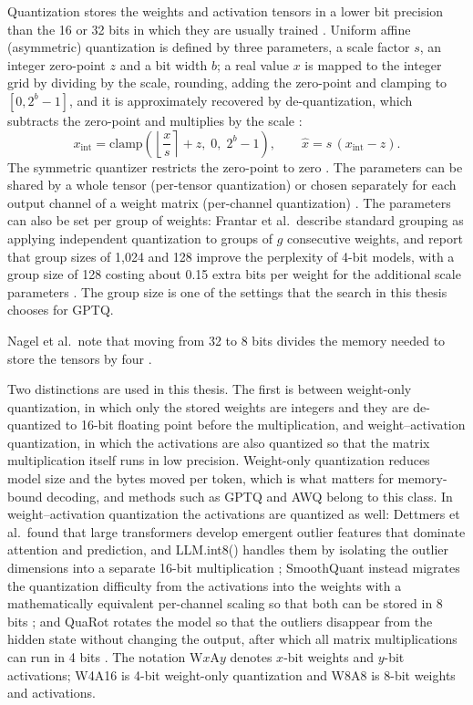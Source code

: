 Quantization stores the weights and activation tensors in a lower bit precision than the 16 or 32 bits in which they are usually trained \cite{nagel2021whitepaper}. Uniform affine (asymmetric) quantization is defined by three parameters, a scale factor $s$, an integer zero-point $z$ and a bit width $b$; a real value $x$ is mapped to the integer grid by dividing by the scale, rounding, adding the zero-point and clamping to $[0, 2^b - 1]$, and it is approximately recovered by de-quantization, which subtracts the zero-point and multiplies by the scale \cite{nagel2021whitepaper}:
\begin{equation}
  x_{\mathrm{int}} = \mathrm{clamp}\left( \left\lfloor \frac{x}{s} \right\rceil + z,\; 0,\; 2^b - 1 \right), \qquad
  \hat{x} = s \,(x_{\mathrm{int}} - z).
  \label{eq:ch2-quant}
\end{equation}
The symmetric quantizer restricts the zero-point to zero \cite{nagel2021whitepaper}. The parameters can be shared by a whole tensor (per-tensor quantization) or chosen separately for each output channel of a weight matrix (per-channel quantization) \cite{nagel2021whitepaper}. The parameters can also be set per group of weights: Frantar et al.\ describe standard grouping as applying independent quantization to groups of $g$ consecutive weights, and report that group sizes of 1{,}024 and 128 improve the perplexity of 4-bit models, with a group size of 128 costing about 0.15 extra bits per weight for the additional scale parameters \cite{frantar2023gptq}. The group size is one of the settings that the search in this thesis chooses for GPTQ.

Nagel et al.\ note that moving from 32 to 8 bits divides the memory needed to store the tensors by four \cite{nagel2021whitepaper}.

Two distinctions are used in this thesis. The first is between weight-only quantization, in which only the stored weights are integers and they are de-quantized to 16-bit floating point before the multiplication, and weight--activation quantization, in which the activations are also quantized so that the matrix multiplication itself runs in low precision. Weight-only quantization reduces model size and the bytes moved per token, which is what matters for memory-bound decoding, and methods such as GPTQ \cite{frantar2023gptq} and AWQ \cite{lin2024awq} belong to this class. In weight--activation quantization the activations are quantized as well: Dettmers et al.\ found that large transformers develop emergent outlier features that dominate attention and prediction, and LLM.int8() handles them by isolating the outlier dimensions into a separate 16-bit multiplication \cite{dettmers2022llmint8}; SmoothQuant instead migrates the quantization difficulty from the activations into the weights with a mathematically equivalent per-channel scaling so that both can be stored in 8 bits \cite{xiao2023smoothquant}; and QuaRot rotates the model so that the outliers disappear from the hidden state without changing the output, after which all matrix multiplications can run in 4 bits \cite{ashkboos2024quarot}. The notation W$x$A$y$ denotes $x$-bit weights and $y$-bit activations; W4A16 is 4-bit weight-only quantization and W8A8 is 8-bit weights and activations.

